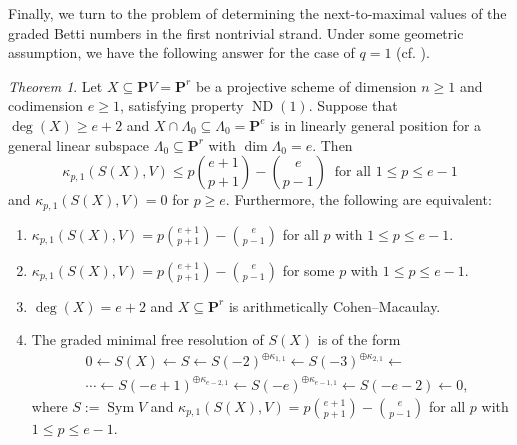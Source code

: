 \documentclass[12pt]{amsart}
\theoremstyle{definition}
\theoremstyle{remark}
\theoremstyle{corollary}
\theoremstyle{theorem}
\theoremstyle{corollary}
\newtheorem{theorem}{Theorem}[section]
\theoremstyle{corollary}
\theoremstyle{definition}
\theoremstyle{remark}
\numberwithin{equation}{section}
\def\nP{\mathbf{P}}
\def\Sym{\operatorname{Sym}}
\DeclareMathOperator{\ND}{ND}
\begin{document}
Finally, we turn to the problem of determining the next-to-maximal values of the graded Betti numbers in the first nontrivial strand. Under some geometric assumption, we have the following answer for the case of $q=1$ (cf. \cite[Theorems 4.1 and 4.3]{HK}).


\begin{theorem}\label{thm:next-to-maximal}
Let $X \subseteq \nP V = \nP^r$ be a projective scheme of dimension $n \geq 1$ and codimension $e \geq 1$, satisfying property $\ND(1)$. Suppose that $\deg(X) \geq e+2$ and $X \cap \Lambda_0 \subseteq \Lambda_0 = \nP^e$ is in linearly general position for a general linear subspace $\Lambda_0 \subseteq \nP^r$ with $\dim \Lambda_0=e$. Then
$$
\kappa_{p,1}(S(X), V) \leq p {e+1 \choose p+1} - {e \choose p-1}~\text{ for all $1 \leq p \leq e-1$}
$$
and $\kappa_{p,1}(S(X), V)=0$ for $p \geq e$.
Furthermore, the following are equivalent:
\begin{enumerate}
 \item $\kappa_{p,1}(S(X), V) = p {e+1 \choose p+1} - {e \choose p-1}$ for all $p$ with $1 \leq p \leq e-1$.
 \item  $\kappa_{p,1}(S(X), V) = p {e+1 \choose p+1} - {e \choose p-1}$ for some $p$ with $1 \leq p \leq e-1$.
 \item $\deg (X) = e+2$ and $X \subseteq \nP^r$ is arithmetically Cohen--Macaulay. 
 \item The graded minimal free resolution of $S(X)$ is of the form
 \begin{align*}
& 0 \longleftarrow S(X) \longleftarrow S \longleftarrow S(-2)^{\oplus \kappa_{1,1}} \longleftarrow S(-3)^{\oplus  \kappa_{2,1}}  \longleftarrow  \\
& \cdots \longleftarrow S(-e+1)^{\oplus  \kappa_{e-2, 1}} \longleftarrow S(-e)^{\oplus  \kappa_{e-1, 1}}\longleftarrow S(-e-2)\longleftarrow 0,
 \end{align*}
 where $S:=\Sym V$ and $\kappa_{p,1}(S(X), V) = p {e+1 \choose p+1} - {e \choose p-1}$ for all $p$ with $1 \leq p \leq e-1$.
\end{enumerate}
\end{theorem}
\end{document}
